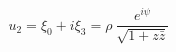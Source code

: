 \begin{equation}
u_{2} = \xi_{0} + i \xi_{3} = \rho~\frac{ e^{i\psi}}{\sqrt{1+z\bar{z}}}  \label{6.12b}
\end{equation}

